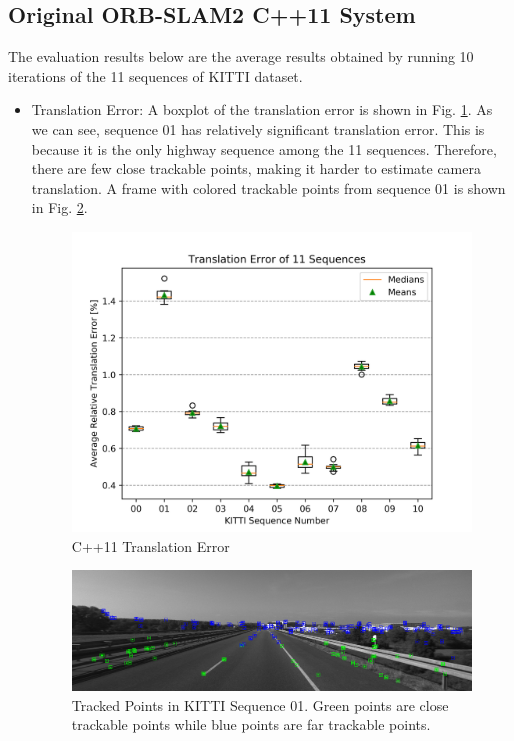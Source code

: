 \documentclass[letterpaper, 10 pt, conference]{IEEEtran}
\begin{document}
\subsection{Original ORB-SLAM2 C++11 System} \label{sect:\thesubsection}
The evaluation results below are the average results obtained by running 10
iterations of the 11 sequences of KITTI dataset.
\begin{itemize}
    \item Translation Error: \newline
    A boxplot of the translation error is shown in Fig. \ref{fig:CTrans}. As we
    can see, sequence 01 has relatively significant translation error. This is
    because it is the only highway sequence among the 11 sequences. Therefore,
    there are few close trackable points, making it harder to estimate camera
    translation. A frame with colored trackable points from sequence 01 is shown
    in Fig. \ref{fig:KITTI01}. 
    
    \begin{figure}[htbp]
    \centerline{\includegraphics[scale=0.59]
    {images/Evaluation/C++/trans_error.png}}
    \caption{C++11 Translation Error}
    \label{fig:CTrans}
    \end{figure}
    
    \begin{figure}[htbp]
    \centerline{\includegraphics[scale=0.2]
    {images/Evaluation/C++/Sequence_01_Tracked_Points.png}}
    \caption{Tracked Points in KITTI Sequence 01. Green points are close
    trackable points while blue points are far trackable points.}
    \label{fig:KITTI01}
    \end{figure}
    

\end{itemize}
\end{document}
